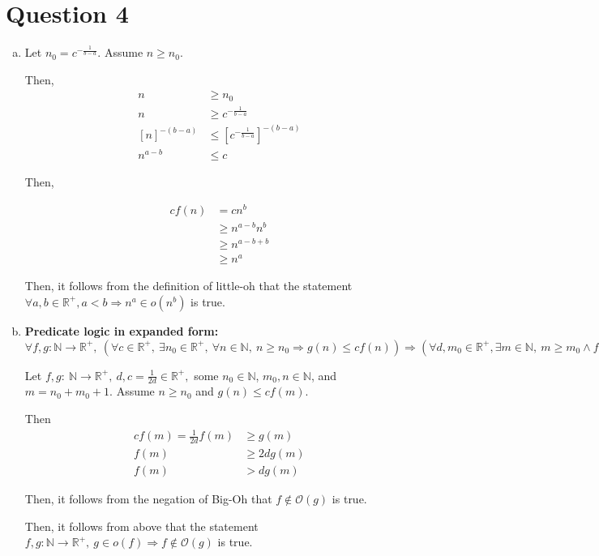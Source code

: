 \documentclass[12pt]{article}
\begin{document}
\section*{Question 4}
\begin{enumerate}[a.]
    \item

    Let $n_0 = c^{-\frac{1}{b-a}}$. Assume $n \geq n_0$.

    \bigskip

    Then,
    \setcounter{equation}{0}
    \begin{align}
        n &\geq n_0\\
        n &\geq c^{-\frac{1}{b-a}}\\
        \left[n\right]^{-(b-a)}&\leq \left[c^{-\frac{1}{b-a}}\right]^{-(b-a)}\\
        n^{a-b} &\leq c
    \end{align}

    \bigskip

    Then,

    \begin{align}
        cf(n) &= cn^b\\
        &\geq n^{a-b}n^b\\
        &\geq n^{a-b+b}\\
        &\geq n^a
    \end{align}

    Then, it follows from the definition of little-oh that the statement
    $\forall a,b \in \mathbb{R}^{+}, a < b \Rightarrow n^a \in o(n^b)$ is true.

    \item

    \textbf{Predicate logic in expanded form:} $\forall f,g:\mathbb{N} \to \mathbb{R}^{+},\:
    (\forall c \in \mathbb{R}^{+},\:\exists n_0 \in \mathbb{R}^{+},\:\forall n \in
    \mathbb{N},\: n \geq n_0 \Rightarrow g(n) \leq cf(n)) \Rightarrow (\forall d,m_0
    \in \mathbb{R}^{+}, \exists m \in \mathbb{N},\: m \geq m_0 \land f(m) > dg(m))$

    \bigskip

    Let $f,g:\:\mathbb{N} \to \mathbb{R}^{+},\:d,c=\frac{1}{2d} \in \mathbb{R}^{+},
    $ some $n_0 \in \mathbb{N}$, $m_0,n \in \mathbb{N}$, and $m = n_0 + m_0 + 1$.
    Assume $n \geq n_0$ and $g(n) \leq cf(m)$.

    \bigskip

    Then
    \setcounter{equation}{0}
    \begin{align}
        cf(m) = \frac{1}{2d} f(m) &\geq g(m)\\
        f(m) &\geq 2dg(m)\\
        f(m) &> dg(m)
    \end{align}

    Then, it follows from the negation of Big-Oh that $f \notin \mathcal{O}(g)$ is true.

    \bigskip

    Then, it follows from above that the statement $f,g:\mathbb{N} \to \mathbb{R}^{+},\:
    g \in o(f) \Rightarrow f \notin \mathcal{O}(g)$ is true.

\end{enumerate}
\end{document}
